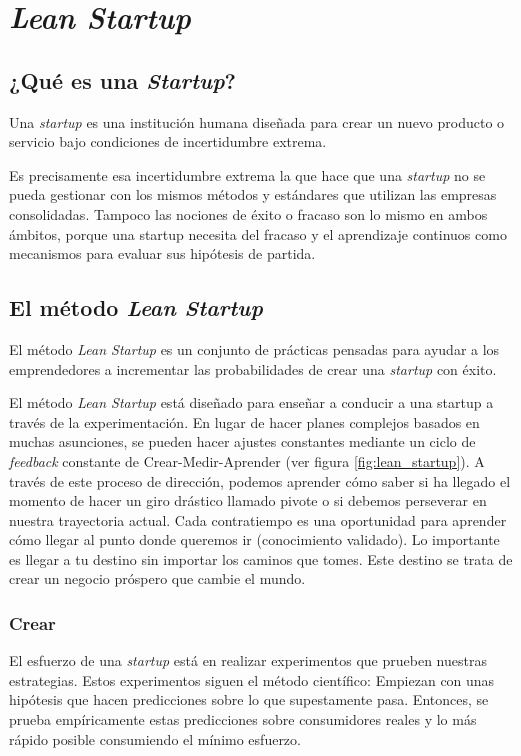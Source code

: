 \chapter{\textit{Lean Startup}}


\section{¿Qué es una \textit{Startup}?}
Una \textit{startup} es una institución humana  diseñada para crear un nuevo producto o servicio bajo condiciones de incertidumbre extrema.


Es precisamente esa incertidumbre extrema la que hace que una \textit{startup} no se pueda gestionar con los mismos métodos y estándares que utilizan las empresas consolidadas. Tampoco las nociones de éxito o fracaso son lo mismo en ambos ámbitos, porque una startup necesita del fracaso y el aprendizaje continuos como mecanismos para evaluar sus hipótesis de partida.


\section{El método \textit{Lean Startup}}
El método \textit{Lean Startup} es un conjunto de prácticas pensadas para ayudar a los emprendedores a incrementar las probabilidades de crear una \textit{startup} con éxito. 


El método \textit{Lean Startup} está diseñado para enseñar a conducir a una startup a través de la experimentación. En lugar de hacer planes complejos basados en muchas asunciones, se pueden hacer ajustes constantes mediante un ciclo de \textit{feedback} constante de Crear-Medir-Aprender (ver figura \ref{fig:lean_startup}). A través de este proceso de dirección, podemos aprender cómo saber si ha llegado el momento de hacer un giro drástico llamado pivote o si debemos perseverar en nuestra trayectoria actual. Cada contratiempo es una oportunidad para aprender cómo llegar al punto donde queremos ir (conocimiento validado). Lo importante es llegar a tu destino sin importar los caminos que tomes. Este destino se trata de crear un negocio próspero que cambie el mundo.


\subsection{Crear}
El esfuerzo de una \textit{startup} está en realizar experimentos que prueben nuestras estrategias. Estos experimentos siguen el método científico: Empiezan con unas hipótesis que hacen predicciones sobre lo que supestamente pasa. Entonces, se prueba empíricamente estas predicciones sobre consumidores reales y lo más rápido posible consumiendo el mínimo esfuerzo.


